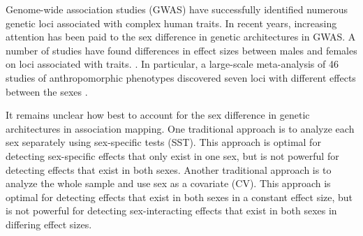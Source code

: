 \documentclass[11pt]{article}
\begin{document}
Genome-wide association studies (GWAS) have successfully identified numerous genetic loci 
associated with complex human traits. 
In recent years, increasing attention has been paid to the sex difference in genetic architectures in GWAS. 
A number of studies have found differences in effect sizes between males and females on loci associated with traits. 
\citep{Kubo:Gut:2013,Peters:Stroke:2013,Chen:ObesRev:2013,Boraska:HumMolGenet:2012,Kostis:JAmCollCardiol:2012,Magi:GenetEpidemiol:2010,Fox:PlosGenet:2012,Porcu:PlosGenet:2013,Mason:AlcoholClinExpRes:2012,kang2014metagxe,Ohmen:JAssocResOtolaryngol:2014,Randall:PlosGenet:2013}.
In particular, a large-scale meta-analysis
 of 46 studies of anthropomorphic phenotypes 
discovered seven loci with different effects between the sexes 
\citep{Randall:PlosGenet:2013}.

It remains unclear how best to account for the sex difference in genetic architectures in association mapping.
One traditional approach is to analyze each sex separately using sex-specific tests (SST). 
This approach is optimal for detecting sex-specific effects that only exist in one sex,
but is not powerful for detecting effects that exist in both sexes.
Another traditional approach is to analyze the whole sample and use sex as a covariate (CV). 
This approach is optimal for detecting effects that exist in both sexes in a constant effect size, 
but is not powerful for detecting sex-interacting effects that exist in both sexes in
differing effect sizes.

\end{document}
